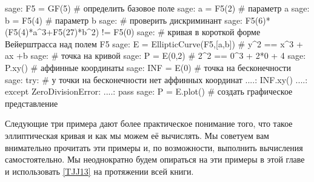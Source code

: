 \begin{sagecommandline}
sage: F5 = GF(5) # определить базовое поле
sage: a = F5(2) # параметр a
sage: b = F5(4) # параметр b
sage: # проверить дискриминант
sage: F5(6)*(F5(4)*a^3+F5(27)*b^2) != F5(0)
sage: # кривая в короткой форме Вейерштрасса над полем F5
sage: E = EllipticCurve(F5,[a,b]) # y^2 == x^3 + ax +b 
sage: # точка на кривой
sage: P = E(0,2) # 2^2 == 0^3 + 2*0 + 4
sage: P.xy() # аффинные координаты
sage: INF = E(0) # точка на бесконечности
sage: try: 	# у точки на бесконечности нет аффинных координат
....:     INF.xy()
....: except ZeroDivisionError:
....:     pass
sage: P = E.plot() # создать графическое представление 
\end{sagecommandline}
Следующие три примера дают более практическое понимание того, что такое эллиптическая кривая и как мы можем её вычислять. Мы советуем вам внимательно прочитать эти примеры и, по возможности, выполнить вычисления самостоятельно. Мы неоднократно будем опираться на эти примеры в этой главе и использовать \examplename{} \ref{TJJ13} на протяжении всей книги.
